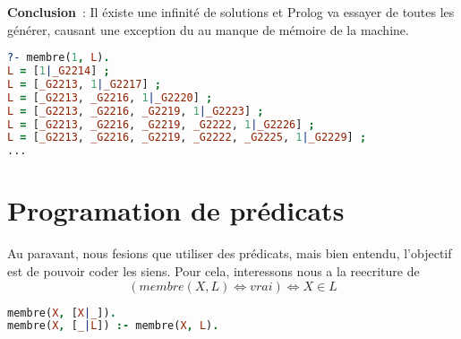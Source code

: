\textbf{Conclusion}~: Il éxiste une infinité de solutions et Prolog va essayer
de toutes les générer, causant une exception du au manque de mémoire de la
machine.

\begin{lstlisting}[language=Prolog]
?- membre(1, L).
L = [1|_G2214] ;
L = [_G2213, 1|_G2217] ;
L = [_G2213, _G2216, 1|_G2220] ;
L = [_G2213, _G2216, _G2219, 1|_G2223] ;
L = [_G2213, _G2216, _G2219, _G2222, 1|_G2226] ;
L = [_G2213, _G2216, _G2219, _G2222, _G2225, 1|_G2229] ;
...
\end{lstlisting}


\section{Programation de prédicats}

Au paravant, nous fesions que utiliser des prédicats, mais bien entendu,
l'objectif est de pouvoir coder les siens. Pour cela, interessons nous a la
reecriture de
\[(membre(X, L) \Leftrightarrow vrai) \Leftrightarrow X \in L\]

\begin{lstlisting}[language=Prolog]
membre(X, [X|_]).
membre(X, [_|L]) :- membre(X, L).
\end{lstlisting}
